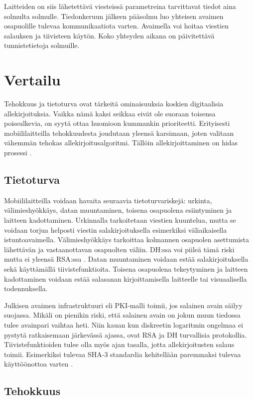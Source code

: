 \documentclass[finnish]{tktltiki2}
\theoremstyle{definition}
\theoremstyle{remark}
\begin{document}
Laitteiden on siis lähetettävä viesteissä parametreina tarvittavat tiedot aina solmulta solmulle. Tiedonkeruun jälkeen pääsolmu luo yhteisen avaimen osapuolille tulevaa kommunikaatiota varten. Avaimella voi hoitaa viestien salauksen ja tiivisteen käytön. Koko yhteyden aikana on päivitettävä tunnistetietoja solmuille.

\section{Vertailu}

Tehokkuus ja tietoturva ovat tärkeitä ominaisuuksia koskien digitaalisia allekirjoituksia. Vaikka nämä kaksi seikkaa eivät ole suoraan toisensa poissulkevia, on syytä ottaa huomioon kummankin prioriteetti. Erityisesti mobiililaitteilla tehokkuudesta joudutaan yleensä karsimaan, joten valitaan vähemmän tehokas allekirjoitusalgoritmi. Tällöin allekirjoittaminen on hidas prosessi \cite{proxy}.

\subsection{Tietoturva}

Mobiililaitteilla voidaan havaita seuraavia tietoturvariskejä: urkinta, välimieshyökkäys, datan muuntaminen, toisena osapuolena esiintyminen ja laitteen kadottaminen. Urkinnalla tarkoitetaan viestien kuuntelua, mutta se voidaan torjua helposti viestin salakirjoituksella esimerkiksi väliaikaisella istuntoavaimella. Välimieshyökkäys tarkoittaa kolmannen osapuolen asettumista lähettävän ja vastaanottavan osapuolten väliin. DH:ssa voi piileä tämä riski mutta ei yleensä RSA:ssa \cite{enti}. Datan muuntaminen voidaan estää salakirjoituksella sekä käyttämällä tiivistefunktioita. Toisena osapuolena tekeytyminen ja laitteen kadottaminen voidaan estää salasanan kirjoittamisella laitteelle tai visuaalisella todennuksella. 

Julkisen avaimen infrastruktuuri eli PKI-malli toimii, jos salainen avain säilyy suojassa. Mikäli on pienikin riski, että salainen avain on jokun muun tiedossa tulee avainpari vaihtaa heti. Niin kauan kun diskreetin logaritmin ongelmaa ei pystytä ratkaisemaan järkevässä ajassa, ovat RSA ja DH turvallisia protokollia. Tiivistefunktioiden tulee olla myös ajan tasalla, jotta allekirjoitusten salaus toimii. Esimerkiksi tulevaa SHA-3 standardia kehitellään paremmaksi tulevaa käyttöönottoa varten \cite{nist}.
	  

\subsection{Tehokkuus}
\end{document}
